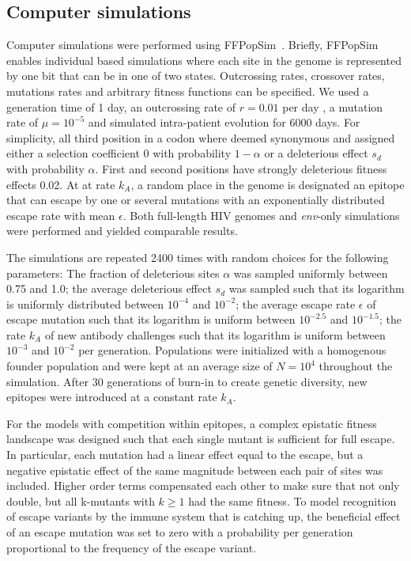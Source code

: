 \documentclass[rmp, twocolumn]{revtex4}
\newcommand{\env}{\textit{env}}
\begin{document}
\subsection{Computer simulations}
Computer simulations were performed using
FFPopSim~\citep{zanini_ffpopsim:_2012}. Briefly, FFPopSim enables individual
based simulations where each site in the genome is represented by one bit that
can be in one of two states. Outcrossing rates, crossover rates, mutations rates
and arbitrary fitness functions can be specified. We used a generation time of 1
day, an outcrossing rate of $r=0.01$ per
day \citep{batorsky_estimate_2011,neher_recombination_2010}, a mutation rate of
$\mu=10^{-5}$ \citep{mansky_lower_1995,abram_nature_2010} and simulated
intra-patient evolution for 6000 days. For simplicity, all third position in a
codon where deemed synonymous and assigned either a selection coefficient $0$
with probability $1-\alpha$ or a deleterious effect $s_d$ with probability
$\alpha$.
First and second positions have strongly deleterious fitness effects
0.02. At at rate $k_A$, a random place in the genome is
designated an epitope that can escape by one or several mutations with an
exponentially distributed escape rate with mean $\epsilon$. Both full-length HIV
genomes and \env{}-only simulations were performed and yielded comparable results.

The simulations are repeated 2400 times with random choices for the following
parameters: The fraction of deleterious sites $\alpha$ was sampled uniformly
between 0.75 and 1.0; the average deleterious effect $s_d$ was sampled such that
its logarithm is uniformly distributed  between $10^{-4}$ and $10^{-2}$; the
average escape rate $\epsilon$ of escape mutation such that its logarithm is
uniform between $10^{-2.5}$ and $10^{-1.5}$; the rate $k_A$ of new antibody
challenges such that its logarithm is uniform between $10^{-3}$ and $10^{-2}$
per generation. Populations were initialized with a homogenous founder
population and were kept at an average size of $N=10^4$ throughout the
simulation. After 30 generations of burn-in to create genetic diversity, new
epitopes were introduced at a constant rate $k_A$. 

For the models with competition within epitopes, a complex epistatic fitness
landscape was designed such that each single mutant is sufficient for full
escape. In particular, each mutation had a linear effect equal to the escape,
but a negative epistatic effect of the same magnitude between each pair of sites
was included. Higher order terms compensated each other to make sure that not
only double, but all k-mutants with $k \geq 1$ had the same fitness. To model
recognition of escape variants by the immune system that is catching up, the
beneficial effect of an escape mutation was set to zero with a probability per
generation proportional to the frequency of the escape variant.
\end{document}
